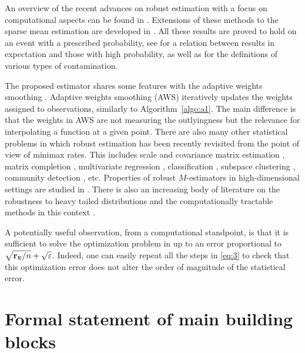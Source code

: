 \documentclass[aos,preprint,reqno]{imsart}
\newcommand\bSigma{\boldsymbol\Sigma}
\newcommand\rSigma{\textbf{\textup{r}}_{\scriptscriptstyle\bSigma}}
\theoremstyle{plain}
\theoremstyle{remark}
\begin{document}
	An overview of the recent advances on robust estimation with a 
	focus on computational aspects can be found in \citep{Diak_review}. 
	Extensions of these methods to the sparse mean estimation are 
	developed in \citep{BalakrishnanDLS17, DiakonikolasKKP19}. 
	All these results are proved to hold on an event with 
	a prescribed probability, see \citep{bateni2020minimax} 
	for a relation between results in expectation and 
	those with high probability, as well as for the 
	definitions of various types of contamination. 
	
	The proposed estimator shares some features
	with the adaptive weights smoothing \citep{PolzehlSpok}. 
	Adaptive weights smoothing (AWS) iteratively updates the weights
	assigned to observations, similarly to Algorithm~\ref{algo:a1}.
	The main difference is that the weights in AWS are not measuring
	the outlyingness but the relevance for interpolating a function
	at a given point. There are also many other statistical problems
	in which robust estimation has been recently revisited from
	the point of view of minimax rates. This includes scale
	and covariance matrix estimation \citep{chen2018,
	comminges2018adaptive}, matrix completion \citep{Klopp2017}, 
	multivariate regression \citep{Gao2020,Thompson,geoffrey2019erm}, 
	classification \citep{cannings2020classification,Bradic}, subspace 
	clustering \citep{Soltanolkotabi}, community detection \citep{Cai}, etc. 
	Properties of robust $M$-estimators in high-dimensional settings 
	are studied in \citep{Loh,Elsener}.  
	There is also an increasing body of literature on the robustness 
	to heavy tailed	distributions \citep{Lugosi1,Lugosi2,Devroye, 
	Lecue2019,lecu2017robust,Minsker} and the computationally tractable 
	methods in this context \citep{Hopkins1,flammarion,DongH019,
	depersin2019robust}. 
	
	
	A potentially useful observation, from 
	a computational standpoint, is that it is sufficient 
	to solve the optimization problem in  
	up to an error proportional to $\sqrt{\rSigma/n} 
	+ \sqrt{\varepsilon}$. Indeed, one can easily repeat
	all the steps in \eqref{eq:3} to check that this
	optimization error does not alter the order of magnitude 
	of the statistical error. 
    
    	
	\section{Formal statement of main building blocks}\label{sec:formal}
	
\end{document}
